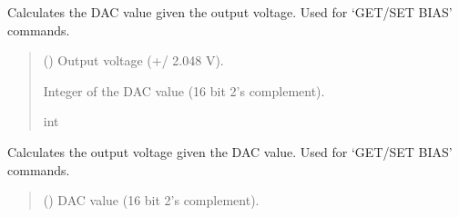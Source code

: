 \documentclass[letterpaper,10pt,english]{sphinxmanual}
\begin{document}
\begin{fulllineitems}
\begin{fulllineitems}
\label{\detokenize{Morelia.Devices:Morelia.Devices.PodDevice_8401HR.Pod8401HR.CalculateBiasDAC_GetDACValue}}
\pysigstartsignatures
{}
\pysigstopsignatures
\sphinxAtStartPar
Calculates the DAC value given the output voltage. Used for ‘GET/SET BIAS’ commands.
\begin{quote}\begin{description}
\sphinxAtStartPar
{} (\sphinxstyleliteralemphasis{\sphinxupquote{ | }}) \textendash{} Output voltage (+/\sphinxhyphen{} 2.048 V).

\sphinxAtStartPar
Integer of the DAC value (16 bit 2’s complement).

\sphinxAtStartPar
int

\end{description}\end{quote}

\end{fulllineitems}


\begin{fulllineitems}
\label{\detokenize{Morelia.Devices:Morelia.Devices.PodDevice_8401HR.Pod8401HR.CalculateBiasDAC_GetVout}}
\pysigstartsignatures
{}
\pysigstopsignatures
\sphinxAtStartPar
Calculates the output voltage given the DAC value. Used for ‘GET/SET BIAS’ commands.
\begin{quote}\begin{description}
\sphinxAtStartPar
{} () \textendash{} DAC value (16 bit 2’s complement).


\end{description}
\end{quote}
\end{fulllineitems}
\end{fulllineitems}
\end{document}
